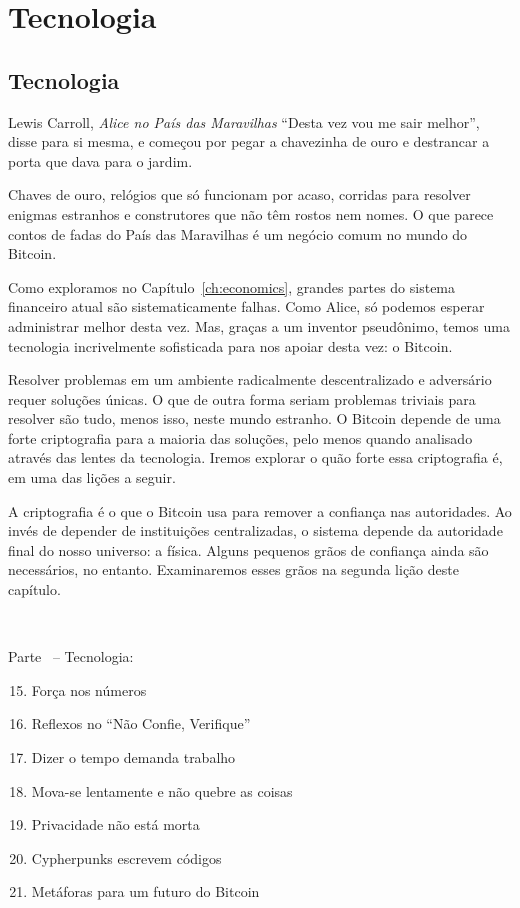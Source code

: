 \part{Tecnologia}
\label{ch:technology}
\chapter*{Tecnologia}

\begin{chapquote}{Lewis Carroll, \textit{Alice no País das Maravilhas}}
\enquote{Desta vez vou me sair melhor}, disse para si mesma, e começou por pegar a chavezinha de ouro e destrancar a porta que dava para o jardim.
\end{chapquote}

Chaves de ouro, relógios que só funcionam por acaso, corridas para resolver enigmas estranhos e construtores que não têm rostos nem nomes. O que parece contos de fadas do País das Maravilhas é um negócio comum no mundo do Bitcoin.

Como exploramos no Capítulo~\ref{ch:economics}, grandes partes do sistema financeiro atual são sistematicamente falhas. Como Alice, só podemos esperar administrar melhor desta vez. Mas, graças a um inventor pseudônimo, temos uma tecnologia incrivelmente sofisticada para nos apoiar desta vez: o Bitcoin.

Resolver problemas em um ambiente radicalmente descentralizado e adversário requer soluções únicas. O que de outra forma seriam problemas triviais para resolver são tudo, menos isso, neste mundo estranho. O Bitcoin depende de uma forte criptografia para a maioria das soluções, pelo menos quando analisado através das lentes da tecnologia. Iremos explorar o quão forte essa criptografia é, em uma das lições a seguir.

A criptografia é o que o Bitcoin usa para remover a confiança nas autoridades. Ao invés de depender de instituições centralizadas, o sistema depende da autoridade final do nosso universo: a física. Alguns pequenos grãos de confiança ainda são necessários, no entanto. Examinaremos esses grãos na segunda lição deste capítulo.

~

\begin{samepage}
Parte~\ref{ch:technology} -- Tecnologia:

\begin{enumerate}
  \setcounter{enumi}{14}
  \item Força nos números
  \item Reflexos no \enquote{Não Confie, Verifique}
  \item Dizer o tempo demanda trabalho
  \item Mova-se lentamente e não quebre as coisas
  \item Privacidade não está morta
  \item Cypherpunks escrevem códigos
  \item Metáforas para um futuro do Bitcoin
\end{enumerate}
\end{samepage}

